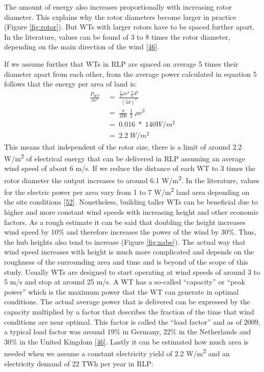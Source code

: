 \documentclass[a4paper,11pt]{article}
\begin{document}
The amount of energy also increases proportionally with increasing rotor diameter. This explains why the rotor diameters become larger in practice (Figure \ref{fig:rotor}). But WTs with larger rotors have to be spaced further apart. In the literature, values can be found of 3 to 8 times the rotor diameter, depending on the main direction of the wind {[}\protect\hyperlink{ref-DavidJCMacKay.2009}{46}{]}.

\newpage

If we assume further that WTs in RLP are spaced on average 5 times their diameter apart from each other, from the average power calculated in equation 5 follows that the energy per area of land is:
\begin{equation}
\begin{split}
\frac{P_{WT}}{m^2}\; & =\; \frac{\frac{1}{2} \rho v^3\; \frac{\pi}{8}d^2}{(5d)^2} \\
 & =\; \frac{\pi}{200}\; \frac{1}{2}\; \rho v^3 \\
 & =\; 0.016\; *\; 140 W/m^2 \\
 & =\; 2.2\; W/m^2
\end{split}
\end{equation}
This means that independent of the rotor size, there is a limit of around 2.2 W/m\textsuperscript{2} of electrical energy that can be delivered in RLP assuming an average wind speed of about 6 m/s. If we reduce the distance of each WT to 3 times the rotor diameter the output increases to around 6.1 W/m\textsuperscript{2}. In the literature, values for the electric power per area vary from 1 to 7 W/m\textsuperscript{2} land area depending on the site conditions {[}\protect\hyperlink{ref-SvenLinow.2020}{52}{]}. Nonetheless, building taller WTs can be beneficial due to higher and more constant wind speeds with increasing height and other economic factors. As a rough estimate it can be said that doubling the height increases wind speed by 10\% and therefore increases the power of the wind by 30\%. Thus, the hub heights also tend to increase (Figure \ref{fig:nabe}). The actual way that wind speed increases with height is much more complicated and depends on the roughness of the surrounding area and time and is beyond of the scope of this study. Usually WTs are designed to start operating at wind speeds of around 3 to 5 m/s and stop at around 25 m/s. A WT has a so-called ``capacity'' or ``peak power'' which is the maximum power that the WT can generate in optimal conditions. The actual average power that is delivered can be expressed by the capacity multiplied by a factor that describes the fraction of the time that wind conditions are near optimal. This factor is called the ``load factor'' and as of 2009, a typical load factor was around 19\% in Germany, 22\% in the Netherlands and 30\% in the United Kingdom {[}\protect\hyperlink{ref-DavidJCMacKay.2009}{46}{]}. Lastly it can be estimated how much area is needed when we assume a constant electricity yield of 2.2 W/m\textsuperscript{2} and an electricity demand of 22 TWh per year in RLP:
\end{document}
